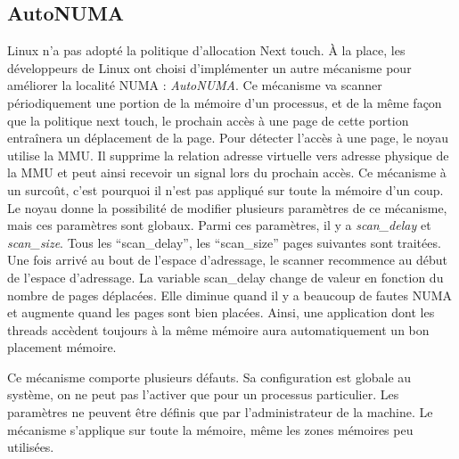 \subsection{AutoNUMA}
\label{sec:autonuma}
Linux n'a pas adopté la politique d'allocation Next touch.
%
\`A la place, les développeurs de Linux ont choisi d'implémenter un autre mécanisme pour améliorer la localité NUMA : {\em AutoNUMA}.
%
Ce mécanisme va scanner périodiquement une portion de la mémoire d'un processus, et de la même façon que la politique next touch, le prochain accès à une page de cette portion entraînera un déplacement de la page.
%
Pour détecter l'accès à une page, le noyau utilise la MMU.
%
Il supprime la relation adresse virtuelle vers adresse physique de la MMU et peut ainsi recevoir un signal lors du prochain accès.
%
Ce mécanisme à un surcoût, c'est pourquoi il n'est pas appliqué sur toute la mémoire d'un coup.
%
Le noyau donne la possibilité de modifier plusieurs paramètres de ce mécanisme, mais ces paramètres sont globaux.
%
Parmi ces paramètres, il y a {\em scan\_delay} et {\em scan\_size}.
%
Tous les ``scan\_delay'', les ``scan\_size'' pages suivantes sont traitées.
%
Une fois arrivé au bout de l'espace d'adressage, le scanner recommence au début de l'espace d'adressage.
%
La variable scan\_delay change de valeur en fonction du nombre de pages déplacées.
%
Elle diminue quand il y a beaucoup de fautes NUMA et augmente quand les pages sont bien placées.
%
Ainsi, une application dont les threads accèdent toujours à la même mémoire aura automatiquement un bon placement mémoire.


Ce mécanisme comporte plusieurs défauts.
%
Sa configuration est globale au système, on ne peut pas l'activer que pour un processus particulier.
%
Les paramètres ne peuvent être définis que par l'administrateur de la machine.
%
Le mécanisme s'applique sur toute la mémoire, même les zones mémoires peu utilisées.

